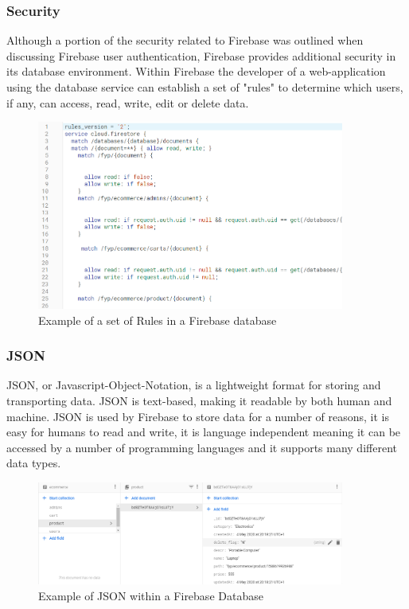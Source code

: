 \subsubsection{Security}
Although a portion of the security related to Firebase was outlined when discussing Firebase user authentication, Firebase provides additional security in its database environment. Within Firebase the developer of a web-application using the database service can establish a set of "rules" to determine which users, if any, can access, read, write, edit or delete data. 
\begin{figure}[h!]
    	\caption{Example of a set of Rules in a Firebase database}
	\centering
	\includegraphics[width=0.9\textwidth]{images/fbrules.png}
\end{figure}

\newpage

\subsubsection{JSON}
JSON, or Javascript-Object-Notation, is a lightweight format for storing and transporting data. JSON is text-based, making it readable by both human and machine. JSON is used by Firebase to store data for a number of reasons, it is easy for humans to read and write, it is language independent meaning it can be accessed by a number of programming languages and it supports many different data types\cite{inproceedings}. 

\begin{figure}[h!]
    	\caption{Example of JSON within a Firebase Database}
	\centering
	\includegraphics[width=0.9\textwidth]{images/jsonfb.png}
\end{figure} 


